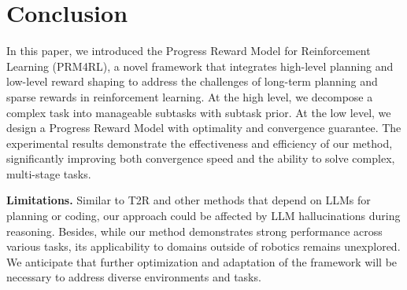 \section{Conclusion}\label{sec:conclusion}
In this paper, we introduced the Progress Reward Model for Reinforcement Learning (PRM4RL), a novel framework that integrates high-level planning and low-level reward shaping to address the challenges of long-term planning and sparse rewards in reinforcement learning.
At the high level, we decompose a complex task into manageable subtasks with subtask prior.
At the low level, we design a Progress Reward Model with optimality and convergence guarantee.
The experimental results demonstrate the effectiveness and efficiency of our method, significantly improving both convergence speed and the ability to solve complex, multi-stage tasks.

\textbf{Limitations.}\label{sec:limitations}
Similar to T2R\cite{xie2024text2reward} and other methods\cite{du2023guiding, brohan2023can, dalal2024plan} that depend on LLMs for planning or coding, our approach could be affected by LLM hallucinations during reasoning\cite{liu2024exploring}.
Besides, while our method demonstrates strong performance across various tasks, its applicability to domains outside of robotics remains unexplored.
We anticipate that further optimization and adaptation of the framework will be necessary to address diverse environments and tasks.
